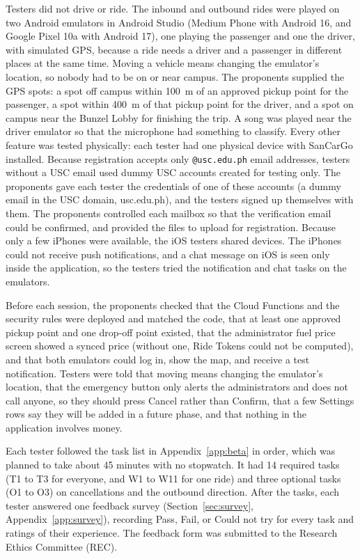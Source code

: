 Testers did not drive or ride. The inbound and outbound rides were played on two Android emulators in Android Studio (Medium Phone with Android 16, and Google Pixel 10a with Android 17), one playing the passenger and one the driver, with simulated GPS, because a ride needs a driver and a passenger in different places at the same time. Moving a vehicle means changing the emulator's location, so nobody had to be on or near campus. The proponents supplied the GPS spots: a spot off campus within 100~m of an approved pickup point for the passenger, a spot within 400~m of that pickup point for the driver, and a spot on campus near the Bunzel Lobby for finishing the trip. A song was played near the driver emulator so that the microphone had something to classify. Every other feature was tested physically: each tester had one physical device with SanCarGo installed. Because registration accepts only \texttt{@usc.edu.ph} email addresses, testers without a USC email used dummy USC accounts created for testing only. The proponents gave each tester the credentials of one of these accounts (a dummy email in the USC domain, usc.edu.ph), and the testers signed up themselves with them. The proponents controlled each mailbox so that the verification email could be confirmed, and provided the files to upload for registration. Because only a few iPhones were available, the iOS testers shared devices. The iPhones could not receive push notifications, and a chat message on iOS is seen only inside the application, so the testers tried the notification and chat tasks on the emulators.

Before each session, the proponents checked that the Cloud Functions and the security rules were deployed and matched the code, that at least one approved pickup point and one drop-off point existed, that the administrator fuel price screen showed a synced price (without one, Ride Tokens could not be computed), and that both emulators could log in, show the map, and receive a test notification. Testers were told that moving means changing the emulator's location, that the emergency button only alerts the administrators and does not call anyone, so they should press Cancel rather than Confirm, that a few Settings rows say they will be added in a future phase, and that nothing in the application involves money.

Each tester followed the task list in Appendix~\ref{app:beta} in order, which was planned to take about 45 minutes with no stopwatch. It had 14 required tasks (T1 to T3 for everyone, and W1 to W11 for one ride) and three optional tasks (O1 to O3) on cancellations and the outbound direction. After the tasks, each tester answered one feedback survey (Section~\ref{sec:survey}, Appendix~\ref{app:survey}), recording Pass, Fail, or Could not try for every task and ratings of their experience. The feedback form was submitted to the Research Ethics Committee (REC).

